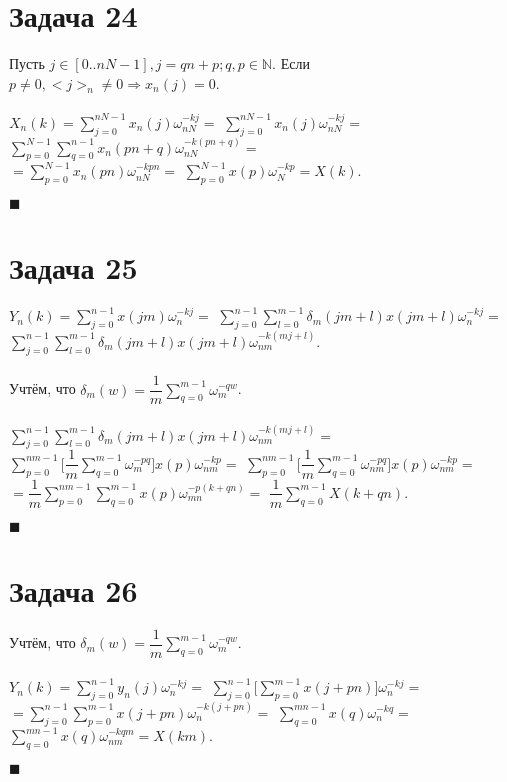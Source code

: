 \documentclass{article}
\newcommand\proofend{\begin{flushright}$\blacksquare$\end{flushright}}
\begin{document}
{\section*{Задача 24}
Пусть $j \in [0..nN-1], j = qn + p; q, p \in \mathbb{N}$. Если $p \neq 0, <j>_n \neq 0 \Rightarrow x_n(j) = 0$.\\ \\
$X_n(k) = \sum\limits_{j=0}^{nN - 1} x_n(j) \omega_{nN}^{-kj} = $
$\sum\limits_{j = 0}^{nN - 1} x_n(j) \omega_{nN}^{-kj} = $
$\sum\limits_{p = 0}^{N - 1} \sum\limits_{q=0}^{n-1} x_n(pn + q) \omega_{nN}^{-k(pn + q)} = $ \\
$ = \sum\limits_{p = 0}^{N - 1} x_n(pn) \omega_{nN}^{-kpn} = $
$\sum\limits_{p = 0}^{N - 1} x(p) \omega_{N}^{-kp} = X(k)$.
\proofend

\section*{Задача 25}
$Y_n(k) = \sum\limits_{j=0}^{n-1}x(jm)\omega_n^{-kj} =$
$\sum\limits_{j=0}^{n-1}\sum\limits_{l=0}^{m-1} \delta_m(jm + l) x(jm + l) \omega_{n}^{-kj}= $
$\sum\limits_{j=0}^{n-1}\sum\limits_{l=0}^{m-1} \delta_m(jm + l) x(jm + l) \omega_{nm}^{-k(mj + l)}.$ \\ \\
Учтём, что $\delta_m(w) = \dfrac{1}{m}\sum\limits_{q=0}^{m-1}\omega_m^{-qw}$. \\ \\
$\sum\limits_{j=0}^{n-1}\sum\limits_{l=0}^{m-1} \delta_m(jm + l) x(jm + l) \omega_{nm}^{-k(mj + l)} = $
$\sum\limits_{p=0}^{nm-1}\Bigg [ \dfrac{1}{m}\sum\limits_{q=0}^{m-1}\omega_m^{-pq}\Bigg ] x(p) \omega_{nm}^{-kp} =$
$\sum\limits_{p=0}^{nm-1}\Bigg [ \dfrac{1}{m}\sum\limits_{q=0}^{m-1}\omega_{nm}^{-pq}\Bigg ] x(p) \omega_{nm}^{-kp} =$ \\
$= \dfrac{1}{m} \sum\limits_{p=0}^{nm-1} \sum\limits_{q=0}^{m-1} x(p) \omega_{mn}^{-p(k + qn)} = $
$ \dfrac{1}{m} \sum\limits_{q = 0}^{m-1} X(k + qn)$.\\
\proofend

\section*{Задача 26}
Учтём, что $\delta_m(w) = \dfrac{1}{m}\sum\limits_{q=0}^{m-1}\omega_m^{-qw}$. \\ \\
$Y_n(k) = \sum\limits_{j = 0}^{n-1} y_n(j) \omega_n^{-kj} =$
$\sum\limits_{j=0}^{n-1} \Bigg [ \sum\limits_{p=0}^{m-1} x(j + pn) \Bigg ] \omega_{n}^{-kj} =$\\
$= \sum\limits_{j=0}^{n-1} \sum\limits_{p=0}^{m-1} x(j + pn) \omega_{n}^{-k(j + pn)} =$
$\sum\limits_{q=0}^{mn-1} x(q) \omega_{n}^{-kq} =$
$\sum\limits_{q=0}^{mn-1} x(q) \omega_{nm}^{-kqm} = X(km).$
\proofend
}
\end{document}
